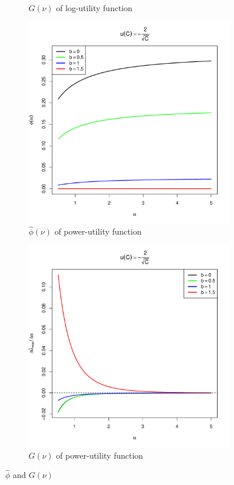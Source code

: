 \documentclass{article}
\begin{document}
\begin{figure}[htb!]
\begin{subfigure}[b]{0.5\linewidth}
    \caption{$G(\nu)$ of log-utility function}
    \label{fig:U_b_t_log}
  \end{subfigure}
  \begin{subfigure}[b]{0.5\linewidth}
    \includegraphics[width=\textwidth]{phi_hat_b_t_power.pdf}
    \caption{$\hat\phi(\nu)$ of power-utility function}
    \label{fig:phi_hat_t_power}
  \end{subfigure}
  \begin{subfigure}[b]{0.5\linewidth}
    \includegraphics[width=\textwidth]{U_b_t_power.pdf}
    \caption{$G(\nu)$ of power-utility function}
    \label{fig:U_b_t_power}
  \end{subfigure}
  \caption{$\hat\phi$ and $G(\nu)$
  }
\end{figure}
\end{document}

